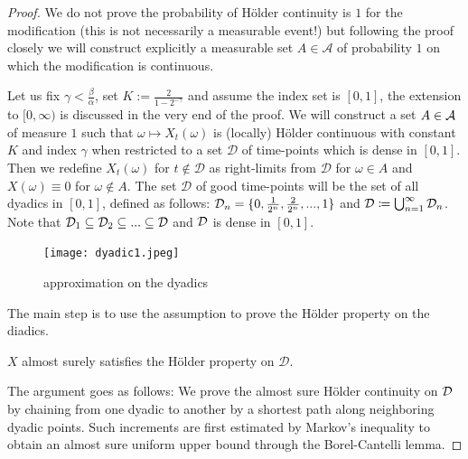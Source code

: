 \begin{proof}[Proof]
	We do not prove the probability of H\"older continuity is $1$ for the modification (this is not necessarily a measurable event!) but following the proof closely we will construct explicitly a measurable set $A\in \mathcal A$ of probability $1$ on which the modification is continuous. \smallskip

	Let us fix $\gamma<\frac{\beta}{\alpha}$, set $K := \frac{2}{1-2^{-\gamma}}$ and assume the index set is $[0,1]$, the extension to $[0,\infty)$ is discussed in the very end of the proof. We will construct a set $A\in \mathcal{A}$ of measure $1$ such that $\omega \mapsto X_t(\omega)$ is (locally) H\"older continuous with constant $K$ and index $\gamma$ when restricted to a set $\mathcal D$ of time-points which is dense in $[0,1]$.  Then we redefine $X_t(\omega)$ for $t\notin \mathcal D$ as right-limits from $\mathcal D$ for $\omega \in A$ and $X(\omega)\equiv 0$ for $\omega \notin A$. The set $\mathcal D$ of good time-points will be the set of all dyadics in $[0,1]$, defined as follows: $\mathcal{D}_n = \{ 0, \frac{1}{2^n},\frac{2}{2^n},...,1\}$ and $\mathcal{D} \coloneqq \bigcup_{n=1}^{\infty} \mathcal{D}_n$. Note that $\mathcal D_1\subseteq\mathcal{D}_2\subseteq ... \subseteq \mathcal{D}$ and $\mathcal{D}$ is dense in $[0,1]$.
	\begin{figure}[h]
		\begin{center}
			\texttt{[image: dyadic1.jpeg]}
			\caption*{approximation on the dyadics}
		\end{center}
		\end{figure}
		The main step is to use the assumption to prove the H\"older property on the diadics.
		\begin{lstep}
			$X$ almost surely satisfies the H\"older property on $\mathcal D$.
		\end{lstep}
	The argument goes as follows: We prove the almost sure H\"older continuity on $\mathcal{D}$ by chaining from one dyadic to another by a shortest path along neighboring dyadic points. Such increments are first estimated by Markov's inequality to obtain an almost sure uniform upper bound through the Borel-Cantelli lemma. \smallskip


\end{proof}
